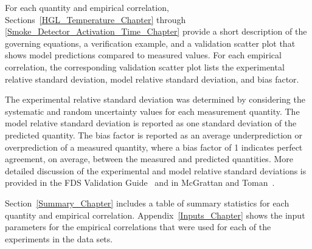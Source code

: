 \documentclass[11pt]{book}
\begin{document}
For each quantity and empirical correlation, Sections~\ref{HGL_Temperature_Chapter} through \ref{Smoke_Detector_Activation_Time_Chapter} provide a short description of the governing equations, a verification example, and a validation scatter plot that shows model predictions compared to measured values. For each empirical correlation, the corresponding validation scatter plot lists the experimental relative standard deviation, model relative standard deviation, and bias factor.

The experimental relative standard deviation was determined by considering the systematic and random uncertainty values for each measurement quantity. The model relative standard deviation is reported as one standard deviation of the predicted quantity. The bias factor is reported as an average underprediction or overprediction of a measured quantity, where a bias factor of 1 indicates perfect agreement, on average, between the measured and predicted quantities. More detailed discussion of the experimental and model relative standard deviations is provided in the FDS Validation Guide~\cite{FDS_Validation_Guide} and in McGrattan and Toman~\cite{McGrattan:Metrologia}.

Section~\ref{Summary_Chapter} includes a table of summary statistics for each quantity and empirical correlation. Appendix~\ref{Inputs_Chapter} shows the input parameters for the empirical correlations that were used for each of the experiments in the data sets.

\cleardoublepage
{}
{}
\tableofcontents

\cleardoublepage
{}
{}
\listoffigures

\cleardoublepage
{}
{}
\listoftables

\mainmatter





















\appendix


\end{document}
